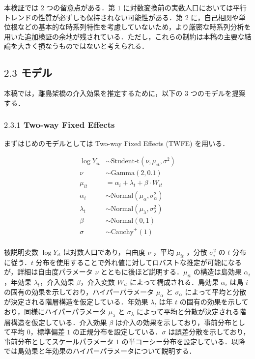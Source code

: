 本検証では \(2\) つの留意点がある．第 \(1\)
に対数変換前の実数人口においては平行トレンドの性質が必ずしも保持されない可能性がある．第
\(2\)
に，自己相関や単位根などの基本的な時系列特性を考慮していないため，より厳密な時系列分析を用いた追加検証の余地が残されている．ただし，これらの制約は本稿の主要な結論を大きく損なうものではないと考えられる．

\hypertarget{ux30e2ux30c7ux30eb}{%
\subsection{\texorpdfstring{\(2.3\)
モデル}{2.3 モデル}}\label{ux30e2ux30c7ux30eb}}

本稿では，離島架橋の介入効果を推定するために，以下の \(3\)
つのモデルを提案する．

\hypertarget{two-way-fixed-effects}{%
\subsubsection{\texorpdfstring{\(2.3.1\) Two-way Fixed
Effects}{2.3.1 Two-way Fixed Effects}}\label{two-way-fixed-effects}}

まずはじめのモデルとしては Two-way Fixed Effects (TWFE) を用いる．

\[
\begin{aligned}
\log{Y_{it}} &\sim \text{Student-t} (\nu, \mu_{it}, \sigma^2) \\
\nu &\sim \text{Gamma}(2, 0.1) \\
\mu_{it} &= \alpha_i + \lambda_t + \beta \cdot W_{it}\\
\alpha_i &\sim \text{Normal}(\mu_{\alpha}, \sigma_{\alpha}^2) \\
\lambda_t &\sim \text{Normal}(\mu_{\lambda}, \sigma_{\lambda}^2) \\
\beta &\sim \text{Normal}(0, 1) \\
\sigma &\sim \text{Cauchy}^+(1) \\
\end{aligned}
\]

被説明変数 \(\log{Y}_{it}\) は対数人口であり，自由度 \(\nu\) ，平均
\(\mu_{it}\) ，分散 \(\sigma_i^2\) の \(t\) 分布に従う．\(t\)
分布を使用することで外れ値に対してロバストな推定が可能になるが，詳細は自由度パラメータ
\(\nu\) とともに後ほど説明する．\(\mu_{it}\) の構造は島効果
\(\alpha_i\)，年効果 \(\lambda_t\)，介入効果 \(\beta\)，介入変数
\(W_{it}\) によって構成される．島効果 \(\alpha_i\) は島 \(i\)
の固有の効果を示しており，ハイパーパラメータ \(\mu_{\alpha}\) と
\(\sigma_{\alpha}\)
によって平均と分散が決定される階層構造を仮定している．年効果
\(\lambda_t\) は年 \(t\)
の固有の効果を示しており，同様にハイパーパラメータ \(\mu_{\lambda}\) と
\(\sigma_{\lambda}\)
によって平均と分散が決定される階層構造を仮定している．介入効果 \(\beta\)
は介入の効果を示しており，事前分布として平均 \(0\)，標準偏差 \(1\)
の正規分布を設定している．\(\sigma\)
は誤差分散を示しており，事前分布としてスケールパラメータ \(1\)
の半コーシー分布を設定している．以降では島効果と年効果のハイパーパラメータについて説明する．

